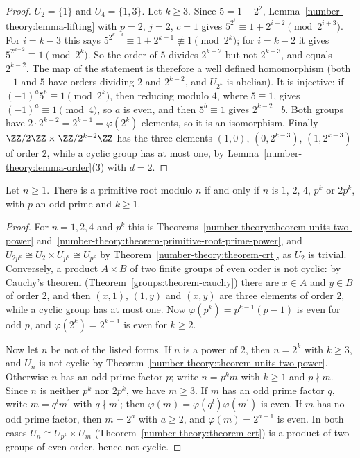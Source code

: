 \begin{proof}
$U_2 = \{\bar{1}\}$ and $U_4 = \{\bar{1}, \bar{3}\}$. Let $k \geq 3$. Since $5 = 1 + 2^2$, Lemma~\ref{number-theory:lemma-lifting} with $p = 2$, $j = 2$, $c = 1$ gives
$5^{2^i} \equiv 1 + 2^{i+2} \pmod{2^{i+3}}$. For $i = k - 3$ this says $5^{2^{k-3}} \equiv 1 + 2^{k-1} \not\equiv 1 \pmod{2^k}$; for $i = k - 2$ it gives $5^{2^{k-2}} \equiv 1 \pmod{2^k}$. So the order of
$5$ divides $2^{k-2}$ but not $2^{k-3}$, and equals $2^{k-2}$. The map of the statement is therefore a well defined homomorphism (both $-1$ and $5$ have orders dividing $2$ and $2^{k-2}$, and $U_{2^k}$ is
abelian). It is injective: if $(-1)^a5^b \equiv 1 \pmod{2^k}$, then reducing modulo $4$, where $5 \equiv 1$, gives $(-1)^a \equiv 1 \pmod 4$, so $a$ is even, and then $5^b \equiv 1$ gives $2^{k-2} \mid b$.
Both groups have $2 \cdot 2^{k-2} = 2^{k-1} = \varphi(2^k)$ elements, so it is an isomorphism. Finally $\ZZ/2\ZZ \times \ZZ/2^{k-2}\ZZ$ has the three elements $(1, 0)$, $(0, 2^{k-3})$, $(1, 2^{k-3})$ of
order $2$, while a cyclic group has at most one, by Lemma~\ref{number-theory:lemma-order}(3) with $d = 2$.
\end{proof}

\begin{theorem}[Gauss]\label{number-theory:theorem-primitive-roots}
Let $n \geq 1$. There is a primitive root modulo $n$ if and only if $n$ is $1$, $2$, $4$, $p^k$ or $2p^k$, with $p$ an odd prime and $k \geq 1$.
\end{theorem}

\begin{proof}
For $n = 1, 2, 4$ and $p^k$ this is Theorems~\ref{number-theory:theorem-units-two-power} and~\ref{number-theory:theorem-primitive-root-prime-power}, and $U_{2p^k} \cong U_2 \times U_{p^k} \cong U_{p^k}$ by
Theorem~\ref{number-theory:theorem-crt}, as $U_2$ is trivial. Conversely, a product $A \times B$ of two finite groups of even order is not cyclic: by Cauchy's theorem (Theorem~\ref{groups:theorem-cauchy})
there are $x \in A$ and $y \in B$ of order $2$, and then $(x, 1)$, $(1, y)$ and $(x, y)$ are three elements of order $2$, while a cyclic group has at most one. Now $\varphi(p^k) = p^{k-1}(p - 1)$ is even
for odd $p$, and $\varphi(2^k) = 2^{k-1}$ is even for $k \geq 2$.

Now let $n$ be not of the listed forms. If $n$ is a power of $2$, then $n = 2^k$ with $k \geq 3$, and $U_n$ is not cyclic by Theorem~\ref{number-theory:theorem-units-two-power}. Otherwise $n$ has an odd
prime factor $p$; write $n = p^km$ with $k \geq 1$ and $p \nmid m$. Since $n$ is neither $p^k$ nor $2p^k$, we have $m \geq 3$. If $m$ has an odd prime factor $q$, write $m = q^lm^{\prime}$ with
$q \nmid m^{\prime}$; then $\varphi(m) = \varphi(q^l)\varphi(m^{\prime})$ is even. If $m$ has no odd prime factor, then $m = 2^a$ with $a \geq 2$, and $\varphi(m) = 2^{a-1}$ is even. In both cases
$U_n \cong U_{p^k} \times U_m$ (Theorem~\ref{number-theory:theorem-crt}) is a product of two groups of even order, hence not cyclic.
\end{proof}


